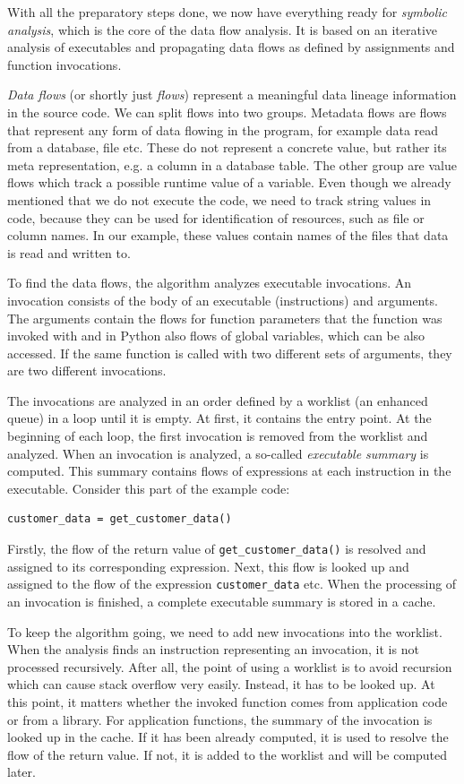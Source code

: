 With all the preparatory steps done, we now have everything ready for \textit{symbolic analysis}, which is the core of the data flow analysis. It is based on an iterative analysis of executables and propagating data flows as defined by assignments and function invocations.
\par
\textit{Data flows} (or shortly just \textit{flows}) represent a meaningful data lineage information in the source code. We can split flows into two groups. Metadata flows are flows that represent any form of data flowing in the program, for example data read from a database, file etc. These do not represent a concrete value, but rather its meta representation, e.g. a column in a database table. The other group are value flows which track a possible runtime value of a variable. Even though we already mentioned that we do not execute the code, we need to track string values in code, because they can be used for identification of resources, such as file or column names. In our example, these values contain names of the files that data is read and written to.
\par
To find the data flows, the algorithm analyzes executable invocations. An invocation consists of the body of an executable (instructions) and arguments. The arguments contain the flows for function parameters that the function was invoked with and in Python also flows of global variables, which can be also accessed. If the same function is called with two different sets of arguments, they are two different invocations.
\par
The invocations are analyzed in an order defined by a worklist (an enhanced queue) in a loop until it is empty. At first, it contains the entry point. At the beginning of each loop, the first invocation is removed from the worklist and analyzed. When an invocation is analyzed, a so-called \textit{executable summary} is computed. This summary contains flows of expressions at each instruction in the executable. Consider this part of the example code:
\begin{verbatim}
customer_data = get_customer_data()
\end{verbatim}
Firstly, the flow of the return value of \texttt{get\_customer\_data()} is resolved and assigned to its corresponding expression. Next, this flow is looked up and assigned to the flow of the expression \texttt{customer\_data} etc. When the processing of an invocation is finished, a complete executable summary is stored in a cache.
\par
To keep the algorithm going, we need to add new invocations into the worklist. When the analysis finds an instruction representing an invocation, it is not processed recursively. After all, the point of using a worklist is to avoid recursion which can cause stack overflow very easily. Instead, it has to be looked up. At this point, it matters whether the invoked function comes from application code or from a library. For application functions, the summary of the invocation is looked up in the cache. If it has been already computed, it is used to resolve the flow of the return value. If not, it is added to the worklist and will be computed later.
